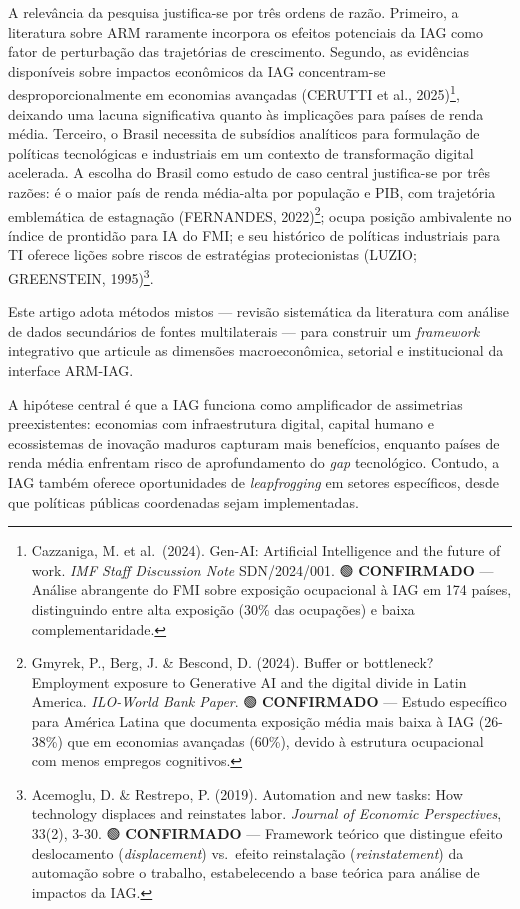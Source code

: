 \documentclass[
  brazilian,
  12pt,
]{article}
\begin{document}
A relevância da pesquisa justifica-se por três ordens de razão. Primeiro, a literatura sobre ARM raramente incorpora os efeitos potenciais da IAG como fator de perturbação das trajetórias de crescimento. Segundo, as evidências disponíveis sobre impactos econômicos da IAG concentram-se desproporcionalmente em economias avançadas (CERUTTI et al., 2025)\footnote{Cazzaniga, M. et al.~(2024). Gen-AI: Artificial Intelligence and the future of work. \emph{IMF Staff Discussion Note} SDN/2024/001. 🟢 \textbf{CONFIRMADO} --- Análise abrangente do FMI sobre exposição ocupacional à IAG em 174 países, distinguindo entre alta exposição (30\% das ocupações) e baixa complementaridade.}, deixando uma lacuna significativa quanto às implicações para países de renda média. Terceiro, o Brasil necessita de subsídios analíticos para formulação de políticas tecnológicas e industriais em um contexto de transformação digital acelerada. A escolha do Brasil como estudo de caso central justifica-se por três razões: é o maior país de renda média-alta por população e PIB, com trajetória emblemática de estagnação (FERNANDES, 2022)\footnote{Gmyrek, P., Berg, J. \& Bescond, D. (2024). Buffer or bottleneck? Employment exposure to Generative AI and the digital divide in Latin America. \emph{ILO-World Bank Paper}. 🟢 \textbf{CONFIRMADO} --- Estudo específico para América Latina que documenta exposição média mais baixa à IAG (26-38\%) que em economias avançadas (60\%), devido à estrutura ocupacional com menos empregos cognitivos.}; ocupa posição ambivalente no índice de prontidão para IA do FMI; e seu histórico de políticas industriais para TI oferece lições sobre riscos de estratégias protecionistas (LUZIO; GREENSTEIN, 1995)\footnote{Acemoglu, D. \& Restrepo, P. (2019). Automation and new tasks: How technology displaces and reinstates labor. \emph{Journal of Economic Perspectives}, 33(2), 3-30. 🟢 \textbf{CONFIRMADO} --- Framework teórico que distingue efeito deslocamento (\emph{displacement}) vs.~efeito reinstalação (\emph{reinstatement}) da automação sobre o trabalho, estabelecendo a base teórica para análise de impactos da IAG.}.

Este artigo adota métodos mistos --- revisão sistemática da literatura com análise de dados secundários de fontes multilaterais --- para construir um \emph{framework} integrativo que articule as dimensões macroeconômica, setorial e institucional da interface ARM-IAG.

A hipótese central é que a IAG funciona como amplificador de assimetrias preexistentes: economias com infraestrutura digital, capital humano e ecossistemas de inovação maduros capturam mais benefícios, enquanto países de renda média enfrentam risco de aprofundamento do \emph{gap} tecnológico. Contudo, a IAG também oferece oportunidades de \emph{leapfrogging} em setores específicos, desde que políticas públicas coordenadas sejam implementadas.
\end{document}
